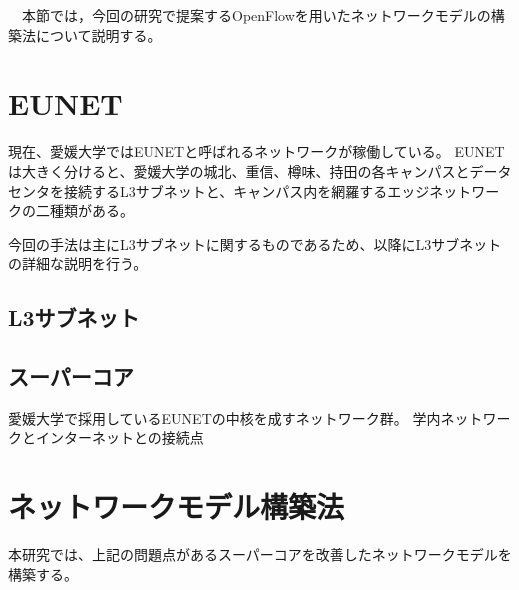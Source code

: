 　本節では，今回の研究で提案するOpenFlowを用いたネットワークモデルの構築法について説明する。

\section{EUNET}

現在、愛媛大学ではEUNETと呼ばれるネットワークが稼働している。
EUNETは大きく分けると、愛媛大学の城北、重信、樽味、持田の各キャンパスとデータセンタを接続するL3サブネットと、キャンパス内を網羅するエッジネットワークの二種類がある。

今回の手法は主にL3サブネットに関するものであるため、以降にL3サブネットの詳細な説明を行う。

\subsection{L3サブネット}



\subsection{スーパーコア}

愛媛大学で採用しているEUNETの中核を成すネットワーク群。
学内ネットワークとインターネットとの接続点

\section{ネットワークモデル構築法}

本研究では、上記の問題点があるスーパーコアを改善したネットワークモデルを構築する。
